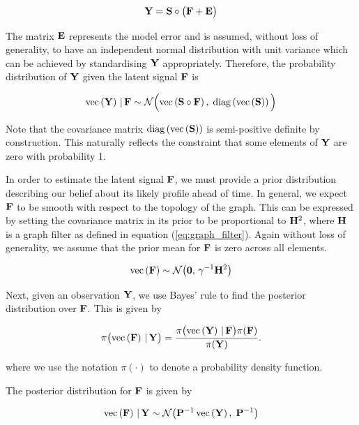 \begin{equation}
    \mathbf{Y} = \mathbf{S} \circ \big(\mathbf{F} + \mathbf{E} \big)
\end{equation}

The matrix $\mathbf{E}$ represents the model error and is assumed, without loss of generality, to have an independent normal distribution with unit variance which can be achieved by standardising $\mathbf{Y}$ appropriately. Therefore, the probability distribution of $\mathbf{Y}$ given the latent signal $\mathbf{F}$ is

\begin{equation}
    \label{eq:Y_given_F}
    \text{\textup{vec}}\left(\mathbf{Y}\right) \, | \, \mathbf{F} \sim \mathcal{N}\Big(\text{\textup{vec}}\left(\mathbf{S} \circ \mathbf{F}\right), \; \text{\textup{diag}}\left(\text{\textup{vec}}\left(\mathbf{S}\right)\right)\Big)
\end{equation}

Note that the covariance matrix $\text{\textup{diag}}\left(\text{\textup{vec}}\left(\mathbf{S}\right)\right)$ is semi-positive definite by construction. This naturally reflects the constraint that some elements of $\mathbf{Y}$ are zero with probability 1. 

In order to estimate the latent signal $\mathbf{F}$, we must provide a prior distribution describing our belief about its likely profile ahead of time. In general, we expect $\mathbf{F}$ to be smooth with respect to the topology of the graph. This can be expressed by setting the covariance matrix in its prior to be proportional to $\mathbf{H}^2$, where $\mathbf{H}$ is a graph filter as defined in equation (\ref{eq:graph_filter}). Again without loss of generality, we assume that the prior mean for $\mathbf{F}$ is zero across all elements.


\begin{equation}
    \label{eq:F_prior}
    \text{\textup{vec}}\left(\mathbf{F}\right) \sim \mathcal{N}\big(\mathbf{0}, \, \gamma^{-1} \mathbf{H}^2\big)
\end{equation}

Next, given an observation $\mathbf{Y}$, we use Bayes' rule to find the posterior distribution over $\mathbf{F}$. This is given by

\begin{equation}
    \pi\big(\text{\textup{vec}}\left(\mathbf{F}\right) \, | \, \mathbf{Y} \big) = \frac{\pi\big(\text{\textup{vec}}\left(\mathbf{Y}\right) \, | \, \mathbf{F} \big) \pi(\mathbf{F}) }{\pi(\mathbf{Y})}.
\end{equation}

where we use the notation $\pi(\cdot)$ to denote a probability density function.

The posterior distribution for $\mathbf{F}$ is given by

\begin{equation}
    \label{eq:F_post_gsr}
    \text{\textup{vec}}\left(\mathbf{F}\right) \, | \, \mathbf{Y} \sim \mathcal{N} \big(\mathbf{P}^{-1} \, \text{\textup{vec}}\left(\mathbf{Y}\right), \; \mathbf{P}^{-1} \big)
\end{equation}

